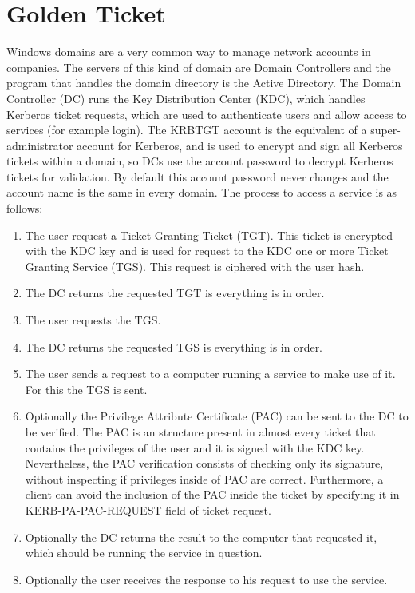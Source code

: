 \section{Golden Ticket}
Windows domains are a very common way to manage network accounts in companies. The servers of this kind of domain are Domain Controllers and the program that handles the domain directory is the Active Directory. The Domain Controller (DC) runs the Key Distribution Center (KDC), which handles Kerberos ticket requests, which are used to authenticate users and allow access to services (for example login).
\linej
The KRBTGT account is the equivalent of a super-administrator account for Kerberos, and is used to encrypt and sign all Kerberos tickets within a domain, so DCs use the account password to decrypt Kerberos tickets for validation. By default this account password never changes and the account name is the same in every domain\cite{stealthbits}.
\linej
\linej
The process to access a service is as follows\cite{tarlogic_theory}\cite{tarlogic_comprehension}:
\begin{enumerate}
	\item The user request a Ticket Granting Ticket (TGT). This ticket is encrypted with the KDC key and is used for request to the KDC one or more Ticket Granting Service (TGS). This request is ciphered with the user hash.
	\item The DC returns the requested TGT is everything is in order.
	\item The user requests the TGS.
	\item The DC returns the requested TGS is everything is in order.
	\item The user sends a request to a computer running a service to make use of it. For this the TGS is sent.
	\item Optionally the Privilege Attribute Certificate (PAC) can be sent to the DC to be verified. The PAC is an structure present in almost every ticket that contains the privileges of the user and it is signed with the KDC key. Nevertheless, the PAC verification consists of checking only its signature, without inspecting if privileges inside of PAC are correct. Furthermore, a client can avoid the inclusion of the PAC inside the ticket by specifying it in KERB-PA-PAC-REQUEST field of ticket request.
	\item Optionally the DC returns the result to the computer that requested it, which should be running the service in question.
	\item Optionally the user receives the response to his request to use the service.
\end{enumerate}


